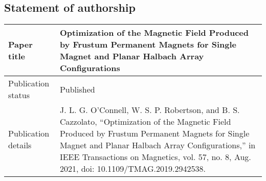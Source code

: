 \newpage
\subsection*{Statement of authorship}
\renewcommand{\arraystretch}{1.5}
\begin{tabular}{m{} m{}}
    \hline \hline Paper title & Optimization of the Magnetic Field Produced by Frustum Permanent Magnets for Single Magnet and Planar Halbach Array Configurations \\ \hline
    Publication status & Published \\ \hline
    Publication details & J. L. G. O’Connell, W. S. P. Robertson, and B. S. Cazzolato, ``Optimization of the Magnetic Field Produced by Frustum Permanent Magnets for Single Magnet and Planar Halbach Array Configurations,'' in IEEE Transactions on Magnetics, vol. 57, no. 8, Aug. 2021, doi: 10.1109/TMAG.2019.2942538. \\ \hline \hline
\end{tabular}

\vfill

